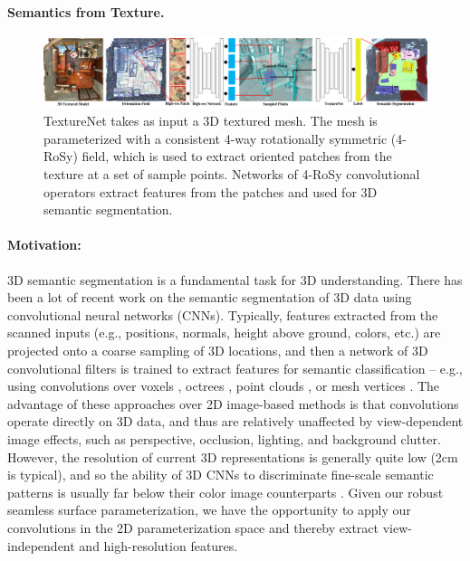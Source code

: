 \paragraph*{Semantics from Texture.}
\begin{figure}
    \begin{center}
        \includegraphics[width=\linewidth]{texturenet/teaser/teaser.pdf}
        \caption{TextureNet takes as input a 3D textured mesh.  The mesh is parameterized with a consistent 4-way rotationally symmetric (4-RoSy) field, which is used to extract oriented patches from the texture at a set of sample points.   Networks of 4-RoSy convolutional operators extract features from the patches and used for 3D semantic segmentation.}
        \label{fig:texturenet-teaser}
    \end{center}    
\end{figure}
\label{intro:texture-learn}

\paragraph*{Motivation:} 3D semantic segmentation is a fundamental task for 3D understanding. There has been a lot of recent work on the semantic segmentation of 3D data using convolutional neural networks (CNNs).  Typically, features extracted from the scanned inputs (e.g., positions, normals, height above ground, colors, etc.) are projected onto a coarse sampling of 3D locations, and then a network of 3D convolutional filters is trained to extract features for semantic classification -- e.g., using convolutions over voxels \cite{wu20153d,maturana2015voxnet,qi2016volumetric,song2017semantic,dai2017scannet,dai2018scancomplete}, octrees \cite{riegler2017octnet}, point clouds \cite{qi2017pointnet,qi2017pointnet++}, or mesh vertices \cite{masci2015geodesic}.  The advantage of these approaches over 2D image-based methods is that convolutions operate directly on 3D data, and thus are relatively unaffected by view-dependent image effects, such as perspective, occlusion, lighting, and background clutter.   However, the resolution of current 3D representations is generally quite low (2cm is typical), and so the ability of 3D CNNs to discriminate fine-scale semantic patterns is usually far below their color image counterparts \cite{long2015fully,he2017mask}. Given our robust seamless surface parameterization, we have the opportunity to apply our convolutions in the 2D parameterization space and thereby extract view-independent and high-resolution features.

